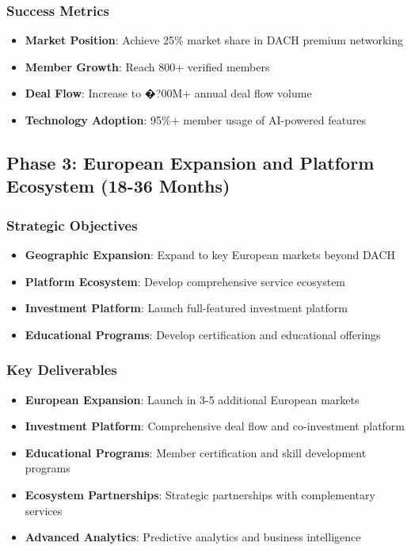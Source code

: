 \subsubsection{Success Metrics}
\begin{itemize}
    \item \textbf{Market Position}: Achieve 25\% market share in DACH premium networking
    \item \textbf{Member Growth}: Reach 800+ verified members
    \item \textbf{Deal Flow}: Increase to �?00M+ annual deal flow volume
    \item \textbf{Technology Adoption}: 95\%+ member usage of AI-powered features
\end{itemize}

\subsection{Phase 3: European Expansion and Platform Ecosystem (18-36 Months)}

\subsubsection{Strategic Objectives}
\begin{itemize}
    \item \textbf{Geographic Expansion}: Expand to key European markets beyond DACH
    \item \textbf{Platform Ecosystem}: Develop comprehensive service ecosystem
    \item \textbf{Investment Platform}: Launch full-featured investment platform
    \item \textbf{Educational Programs}: Develop certification and educational offerings
\end{itemize}

\subsubsection{Key Deliverables}
\begin{itemize}
    \item \textbf{European Expansion}: Launch in 3-5 additional European markets
    \item \textbf{Investment Platform}: Comprehensive deal flow and co-investment platform
    \item \textbf{Educational Programs}: Member certification and skill development programs
    \item \textbf{Ecosystem Partnerships}: Strategic partnerships with complementary services
    \item \textbf{Advanced Analytics}: Predictive analytics and business intelligence
\end{itemize}

